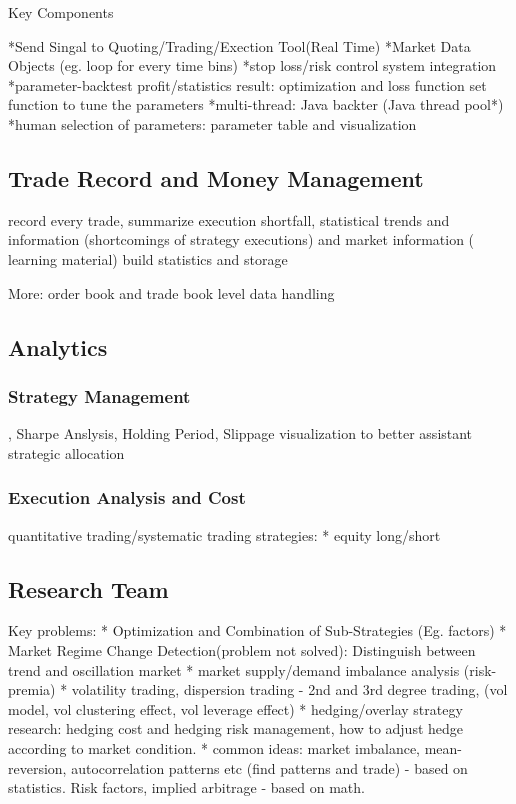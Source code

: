 \documentclass[11pt, openany]{book}              %
\begin{document}
Key Components

*Send Singal to Quoting/Trading/Exection Tool(Real Time)
*Market Data Objects (eg. loop for every time bins)
*stop loss/risk control system integration
*parameter-backtest profit/statistics result: optimization and loss function set function to tune the parameters
*multi-thread: Java backter (Java thread pool*)
*human selection of parameters: parameter table and visualization

\subsection{Trade Record and Money Management}

record every trade, summarize execution shortfall, statistical trends and information (shortcomings of strategy executions) and market information ( learning material) build statistics and storage

More: order book and trade book level data handling

\subsection{Analytics}

\subsubsection{ Strategy Management }, Sharpe Anslysis, Holding Period, Slippage visualization to better assistant strategic allocation

\subsubsection{Execution Analysis and Cost}

quantitative trading/systematic trading strategies:
* equity long/short

\subsection{Research Team}
Key problems:
* Optimization and Combination of Sub-Strategies (Eg. factors)
* Market Regime Change Detection(problem not solved): Distinguish between trend and oscillation market
* market supply/demand imbalance analysis (risk-premia) 
* volatility trading, dispersion trading - 2nd and 3rd degree trading, (vol model, vol clustering effect, vol leverage effect)
* hedging/overlay strategy research: hedging cost and hedging risk management, how to adjust hedge according to market condition.
* common ideas: market imbalance, mean-reversion, autocorrelation patterns etc (find patterns and trade) - based on statistics.  Risk factors, implied arbitrage - based on math. 
\end{document}
